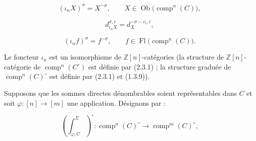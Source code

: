 \begin{equation*}
  (\iota_nX)^\sigma=X^{-\sigma},
  \qquad X\in\operatorname{Ob}\bigl(\operatorname{comp}^{n}(C)\bigr),
\end{equation*}

\begin{equation}
  d_{\iota_nX}^{\sigma,i}=d_X^{-\sigma-e_i,i},
  \tag{2.4.1.2}
\end{equation}

\begin{equation*}
  (\iota_nf)^\sigma=f^{-\sigma},
  \qquad f\in\operatorname{Fl}\bigl(\operatorname{comp}^{n}(C)\bigr).
\end{equation*}

Le foncteur $\iota_n$ est un isomorphisme de $\mathbb Z[n]$-catégories
(la structure de $\mathbb Z[n]$-catégorie de
$\operatorname{comp}^{n}(C^\circ)$ est définie par (2.3.1) ; la structure
graduée de $\operatorname{comp}^{n}(C)^\circ$ est définie par (2.3.1) et
(1.3.9)).

Supposons que les sommes directes dénombrables soient représentables dans
$C$ et soit $\varphi\colon[n]\longrightarrow[m]$ une application.
Désignons par :

\begin{equation}
  \left(\int_{\varphi,C}^{\Sigma}\right)^\circ\colon
  \operatorname{comp}^{n}(C)^\circ
  \longrightarrow
  \operatorname{comp}^{m}(C)^\circ,
  \tag{2.4.1.3}
\end{equation}
